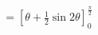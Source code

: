 \documentclass[preview]{standalone}
\begin{document}
\begin{align*}
=\left[\theta + \frac{1}{2}\sin2\theta\right]_0^\frac{\pi}{2}
\end{align*}
\end{document}
